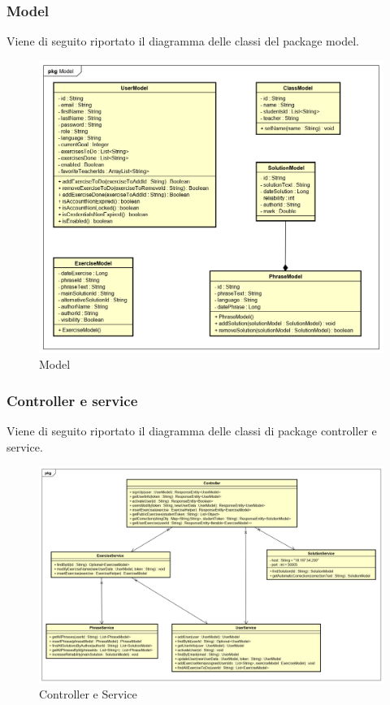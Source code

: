 \subsubsection{Model}
Viene di seguito riportato il diagramma delle classi del package model.
\begin{figure}[H]
\centering
\includegraphics[width=17cm, keepaspectratio]{img/model.png} 
\caption{Model}
\end{figure}
\newpage

\subsubsection{Controller e service}
Viene di seguito riportato il diagramma delle classi di package controller e service.
\begin{figure}[H]
\centering
\includegraphics[width=17cm, keepaspectratio]{img/Controller-service.png} 
\caption{Controller e Service}
\end{figure}
\newpage
